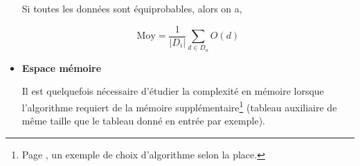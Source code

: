 \begin{itemize}
     Si toutes les donn\'ees sont \'equiprobables, alors on a,

	 \[ \mbox{Moy} = \frac{1}{|D_{i}|}\sum_{d\in D_{n}}O(d) \]

    
   \item  {\bf Espace m\'emoire}

     Il est quelquefois n\'ecessaire d'\'etudier la complexit\'e en m\'emoire
     lorsque l'algorithme requiert de la m\'emoire suppl\'ementaire\footnote{
     Page \pageref{Kmag}, un exemple de choix d'algorithme selon la place.}
     (tableau auxiliaire de m\^eme taille que le tableau donn\'e en entr\'ee
     par exemple). 

\end{itemize} 
\newpage

